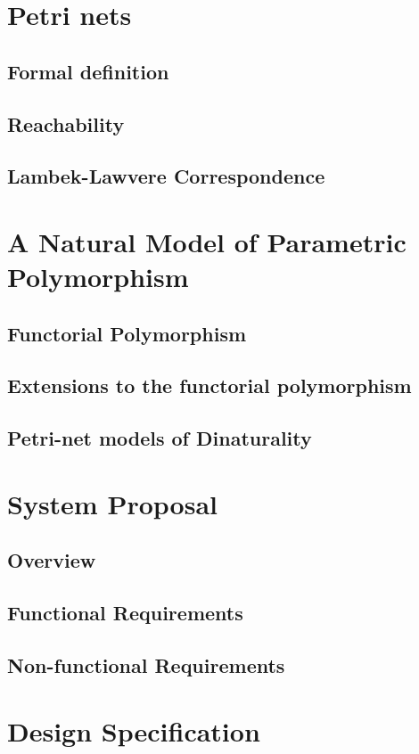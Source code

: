 \documentclass[11pt,openright,hidelinks,a4paper]{article}
\begin{document}
\section{Petri nets}
\subsection{Formal definition}
\subsection{Reachability}
\subsection{Lambek-Lawvere Correspondence}

\section{A Natural Model of Parametric Polymorphism}
\subsection{Functorial Polymorphism}
\subsection{Extensions to the functorial polymorphism}
\subsection{Petri-net models of Dinaturality}

\section{System Proposal}
\subsection{Overview}
\subsection{Functional Requirements}
\subsection{Non-functional Requirements}

\section{Design Specification}
\end{document}
